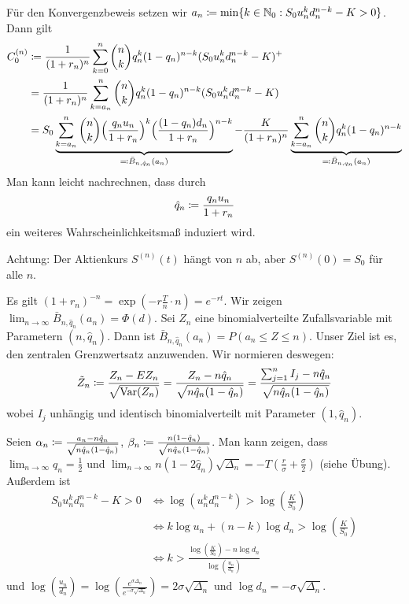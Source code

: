 \documentclass[a4paper,twoside,DIV15,BCOR12mm]{scrbook}
\DeclareMathOperator{\Var}{Var}
\begin{document}
\begin{beweis}
Für den Konvergenzbeweis setzen wir $a_n \da \min \{k \in\MdN_0: S_0 u_n^k d_n^{n-k} - K > 0\}$. Dann gilt
\begin{align*}
C_0^{(n)} &\da \frac 1{(1+r_n)^n} \sum_{k=0}^n \binom n k q_n^k(1-q_n)^{n-k} (S_0 u_n^k d_n^{n-k} - K)^+ \\
&= \frac 1{(1+r_n)^n} \sum_{k=a_n}^n \binom n k q_n^k(1-q_n)^{n-k} (S_0 u_n^k d_n^{n-k} - K) \\
&= S_0 \underbrace{\sum_{k=a_n}^n \binom n k \Big(\frac{q_nu_n}{1+r_n}\Big)^k \Big(\frac{(1-q_n)d_n}{1+r_n}\Big)^{n-k}}_{\ad \bar B_{n,\hat q_n}(a_n)} - \frac K{(1+r_n)^n} \underbrace{\sum_{k=a_n}^n \binom n k q_n^k (1-q_n)^{n-k}}_{\ad \bar B_{n,q_n}(a_n)}
\end{align*}
Man kann leicht nachrechnen, dass durch
\[
\hat q_n \da \frac{q_nu_n}{1+r_n}
\]
ein weiteres Wahrscheinlichkeitsmaß induziert wird.

Achtung: Der Aktienkurs $S^{(n)}(t)$ hängt von $n$ ab, aber $S^{(n)}(0)=S_0$ für alle $n$.

Es gilt $(1+r_n)^{-n} = \exp(-r \frac T n \cdot n) = e^{-rt}$. Wir zeigen $\lim_{n\to\infty} \bar B_{n,\hat q_n} (a_n) = \Phi(d)$. Sei $Z_n$ eine binomialverteilte Zufallsvariable mit Parametern $(n,\hat q_n)$. Dann ist 
$\bar B_{n,\hat q_n} (a_n) = P(a_n \le Z \le n)$. Unser Ziel ist es, den zentralen Grenzwertsatz anzuwenden. Wir normieren deswegen: 
\[
\tilde Z_n \da \frac{Z_n - EZ_n}{\sqrt{\Var(Z_n)}} = \frac{Z_n - n\hat q_n}{\sqrt{n \hat q_n (1-\hat q_n)}} = \frac{\sum_{j=1}^n I_j - n\hat q_n}{\sqrt{n \hat q_n (1-\hat q_n)}}
\]
wobei $I_j$ unhängig und identisch binomialverteilt mit Parameter $(1,\hat q_n)$.

Seien $\alpha_n \da \frac{a_n - n\hat q_n}{\sqrt{n \hat q_n (1-\hat q_n)}}$, $\beta_n \da \frac{n(1-\hat q_n)}{\sqrt{n \hat q_n (1-\hat q_n)}}$. Man kann zeigen, dass $\lim_{n\to\infty} q_n = \frac 12$ und $\lim_{n\to \infty} n(1-2\hat q_n)\sqrt{\Delta_n} = -T (\frac r\sigma + \frac \sigma 2)$ (siehe Übung). Außerdem ist 
\begin{align*}
S_0 u_n^k d_n^{n-k} - K > 0 &\iff \log(u_n^k d_n^{n-k}) > \log (\frac K {S_0}) \\
&\iff k \log u_n + (n-k)\log d_n > \log (\frac K {S_0})\\
&\iff k > \frac{\log(\frac K {S_0}) - n \log d_n}{\log(\frac{u_n}{d_n})} 
\end{align*}
und $\log (\frac{u_n}{d_n}) = \log(\frac{e^{\sigma{\Delta_n}}}{e^{-\sigma\sqrt{\Delta_n}}}) = 2 \sigma \sqrt{\Delta_n}$ und $\log d_n = - \sigma \sqrt{\Delta_n}$.


\end{beweis}
\end{document}
